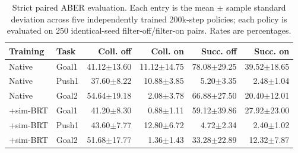 \begin{table}[t]
\centering
\scriptsize
\setlength{\tabcolsep}{2.2pt}
\begin{tabular}{llrrrr}
\toprule
Training & Task & Coll. off & Coll. on & Succ. off & Succ. on\\
\midrule
Native & Goal1 & 41.12$\pm$13.60 & 11.12$\pm$14.75 & 78.08$\pm$29.25 & 39.52$\pm$18.65\\
Native & Push1 & 37.60$\pm$8.22 & 10.88$\pm$3.85 & 5.20$\pm$3.35 & 2.48$\pm$1.04\\
Native & Goal2 & 54.64$\pm$19.18 & 2.08$\pm$3.78 & 66.88$\pm$27.50 & 20.40$\pm$12.01\\
\midrule
+sim-BRT & Goal1 & 41.20$\pm$8.30 & 0.88$\pm$1.11 & 59.12$\pm$39.86 & 27.92$\pm$23.00\\
+sim-BRT & Push1 & 43.60$\pm$7.77 & 12.80$\pm$6.72 & 4.72$\pm$2.34 & 2.40$\pm$1.02\\
+sim-BRT & Goal2 & 51.68$\pm$17.77 & 1.36$\pm$1.43 & 33.28$\pm$22.89 & 12.32$\pm$7.87\\
\bottomrule
\end{tabular}
\caption{Strict paired ABER evaluation. Each entry is the mean
$\pm$ sample standard deviation across five independently trained
200k-step policies; each policy is evaluated on 250 identical-seed
filter-off/filter-on pairs. Rates are percentages.}
\label{tab:pairedmatrix}
\end{table}
